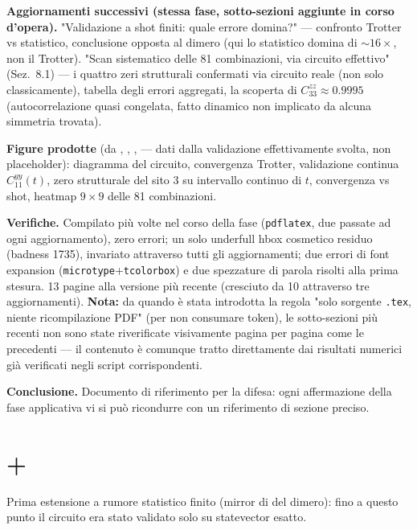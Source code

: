 \documentclass[11pt,a4paper]{article}
\begin{document}
\textbf{Aggiornamenti successivi (stessa fase, sotto-sezioni aggiunte in corso
d'opera).} "Validazione a shot finiti: quale errore domina?" — confronto Trotter
vs statistico, conclusione opposta al dimero (qui lo statistico domina di
$\sim16\times$, non il Trotter). "Scan sistematico delle 81 combinazioni, via
circuito effettivo" (Sez.~8.1) — i quattro zeri strutturali confermati via
circuito reale (non solo classicamente), tabella degli errori aggregati, la
scoperta di $C_{33}^{zz}\approx0.9995$ (autocorrelazione quasi congelata, fatto
dinamico non implicato da alcuna simmetria trovata).

\textbf{Figure prodotte} (da
\texttt{},
\texttt{},
\texttt{},
\texttt{} — dati dalla validazione
effettivamente svolta, non placeholder): diagramma del circuito, convergenza
Trotter, validazione continua $C_{11}^{yy}(t)$, zero strutturale del sito 3 su
intervallo continuo di $t$, convergenza vs shot, heatmap $9\times9$ delle 81
combinazioni.

\textbf{Verifiche.} Compilato più volte nel corso della fase (\texttt{pdflatex},
due passate ad ogni aggiornamento), zero errori; un solo underfull hbox cosmetico
residuo (badness 1735), invariato attraverso tutti gli aggiornamenti; due errori
di font expansion (\texttt{microtype}+\texttt{tcolorbox}) e due spezzature di
parola risolti alla prima stesura. 13 pagine alla versione più recente (cresciuto
da 10 attraverso tre aggiornamenti). \textbf{Nota:} da quando è stata introdotta la
regola "solo sorgente \texttt{.tex}, niente ricompilazione PDF" (per non consumare
token), le sotto-sezioni più recenti non sono state riverificate visivamente pagina
per pagina come le precedenti — il contenuto è comunque tratto direttamente dai
risultati numerici già verificati negli script corrispondenti.

\textbf{Conclusione.} Documento di riferimento per la difesa: ogni affermazione
della fase applicativa vi si può ricondurre con un riferimento di sezione preciso.

\section*{\texttt{} + \texttt{}}

Prima estensione a rumore statistico finito (mirror di
\texttt{} del dimero): fino a questo
punto il circuito era stato validato solo su statevector esatto.
\end{document}
